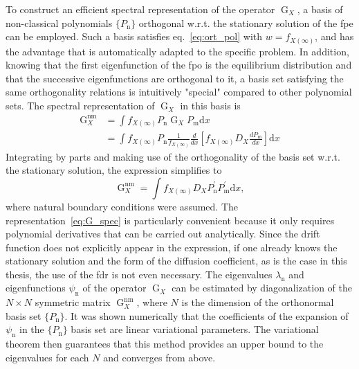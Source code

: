 \documentclass[a4paper,12pt]{book}
\begin{document}
To construct an efficient spectral representation of the operator $\operatorname{G}_X$, a basis of non-classical polynomials $\{P_\text{n}\}$ orthogonal w.r.t. the stationary solution of the \acrshort{fpe} can be employed. Such a basis satisfies eq.~\eqref{eq:ort_pol} with $w = f_{X(\infty)}$, and has the advantage that is automatically adapted to the specific problem. In addition, knowing that the first eigenfunction of the \acrshort{fpo} is the equilibrium distribution and that the successive eigenfunctions are orthogonal to it, a basis set satisfying the same orthogonality relations is intuitively "special" compared to other polynomial sets.
The spectral representation of $\operatorname{G}_X$ in this basis is~\parencite{shizgal1985,shizgal1996,Shizgal1998} 
\begin{equation}
\begin{aligned}
    \operatorname{G}_X^{\text{nm}} & =\int f_{X(\infty)} P_\text{n} \operatorname{G}_X P_\text{m} \mathrm{d} x \\
    & =\int f_{X(\infty)} P_\text{n} \frac{1}{f_{X(\infty)}} \frac{d}{d x}\left[f_{X(\infty)} D_X \frac{d P_\text{m}}{d x}\right] \mathrm{d}x
\end{aligned}
\end{equation}
Integrating by parts and making use of the orthogonality of the basis set w.r.t. the stationary solution, the expression simplifies to 
\begin{equation}
\label{eq:G_spec}
    \operatorname{G}_{X}^{\text{nm}}=\int f_{X(\infty)} D_X P_\text{n}^{\prime}P_\text{m}^{\prime}\mathrm{d}x,
\end{equation}
where natural boundary conditions were assumed. The representation~\eqref{eq:G_spec} is particularly convenient because it only requires polynomial derivatives that can be carried out analytically. Since the drift function does not explicitly appear in the expression, if one already knows the stationary solution and the form of the diffusion coefficient, as is the case in this thesis, the use of the \acrshort{fdr} is not even necessary. The eigenvalues $\lambda_\text{n}$ and eigenfunctions $\psi_\text{n}$ of the operator $\operatorname{G}_{X}$ can be estimated by diagonalization of the $N\times N$ symmetric matrix $\operatorname{G}_{X}^{\text{nm}}$, where $N$ is the dimension of the orthonormal basis set $\{P_\text{n}\}$. 
It was shown numerically that the coefficients of the expansion of $\psi_\text{n}$ in the $\{P_\text{n}\}$ basis set are linear variational parameters. The variational theorem then guarantees that this method provides an upper bound to the eigenvalues for each $N$ and converges from above.
\end{document}

